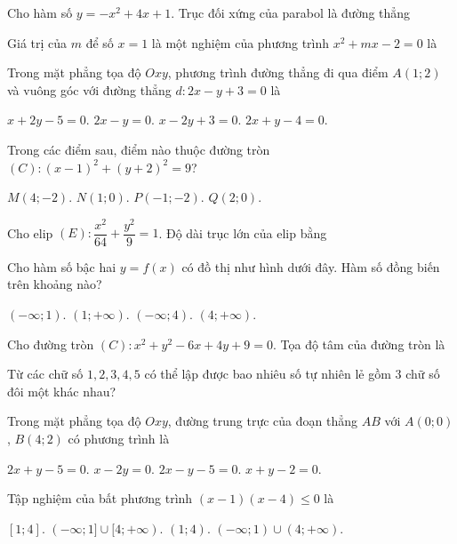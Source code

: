 
\NQuestion Cho hàm số $y=-x^2+4x+1$. Trục đối xứng của parabol là đường thẳng


\NQuestion Giá trị của $m$ để số $x=1$ là một nghiệm của phương trình $x^2+mx-2=0$ là


\NQuestion Trong mặt phẳng tọa độ $Oxy$, phương trình đường thẳng đi qua điểm $A(1;2)$ và vuông góc với đường thẳng $d:2x-y+3=0$ là

\ChoicesTwoLines
{$x+2y-5=0$.}
{$2x-y=0$.}
{$x-2y+3=0$.}
{$2x+y-4=0$.}

\NQuestion Trong các điểm sau, điểm nào thuộc đường tròn $(C):(x-1)^2+(y+2)^2=9$?

\ChoicesTwoLines
{$M(4;-2)$.}
{$N(1;0)$.}
{$P(-1;-2)$.}
{$Q(2;0)$.}

\NQuestion Cho elip $(E):\dfrac{x^2}{64}+\dfrac{y^2}{9}=1$. Độ dài trục lớn của elip bằng


\NQuestion Cho hàm số bậc hai $y=f\left(x\right)$ có đồ thị như hình dưới đây. Hàm số đồng biến trên khoảng nào?

\begin{center}

\end{center}

\ChoicesTwoLines
{$(-\infty;1)$.}
{$(1;+\infty)$.}
{$(-\infty;4)$.}
{$(4;+\infty)$.}

\NQuestion Cho đường tròn $(C):x^2+y^2-6x+4y+9=0$. Tọa độ tâm của đường tròn là


\NQuestion Từ các chữ số $1,2,3,4,5$ có thể lập được bao nhiêu số tự nhiên lẻ gồm $3$ chữ số đôi một khác nhau?


\NQuestion Trong mặt phẳng tọa độ $Oxy$, đường trung trực của đoạn thẳng $AB$ với $A(0;0)$, $B(4;2)$ có phương trình là

\ChoicesTwoLines
{$2x+y-5=0$.}
{$x-2y=0$.}
{$2x-y-5=0$.}
{$x+y-2=0$.}

\NQuestion Tập nghiệm của bất phương trình $(x-1)(x-4)\le 0$ là

\ChoicesTwoLines
{$[1;4]$.}
{$(-\infty;1]\cup[4;+\infty)$.}
{$(1;4)$.}
{$(-\infty;1)\cup(4;+\infty)$.}
